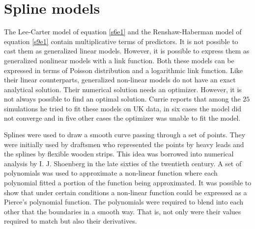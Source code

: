 \documentclass{article}
\numberwithin{equation}{section}
\begin{document}
\section{Spline models}\label{s13}
The Lee-Carter model of equation \eqref{s6e1} and the Renshaw-Haberman model
of equation \eqref{s9e1} contain multiplicative terms of predictors. It is 
not possible to cast them as generalized linear models. However, it is possible
to express them as generalized nonlinear models with a link function. Both
these models can be expressed in terms of Poisson distribution and a logarithmic
link function. Like their linear counterparts, generalized non-linear models
do not have an exact analytical solution. Their numerical solution needs an
optimizer. However, it is not always possible to find an optimal solution.
Currie reports that \cite{currie2013fitting} among the $25$ simulations he
tried to fit these models on UK data, in six cases the model did not converge
and in five other cases the optimizer was unable to fit the model. 

Splines were used to draw a smooth curve passing through a set of points. They
were initially used by draftsmen who represented the points by heavy leads and
the splines by flexible wooden strips. This idea was borrowed into numerical
analysis by I. J. Shoenberg \cite{schoenberg1969cardinal} in the late sixties
of the twentieth century. A set of polynomials was used to approximate a
non-linear function where each polynomial fitted a portion of the function
being approximated. It was possible to show that under certain conditions
\cite{schoenberg1969cardinal} a non-linear function could be expressed as a 
Pierce's polynomial function. The polynomials were required to blend into each
other that the boundaries in a smooth way. That is, not only were their values
required to match but also their derivatives.
\end{document}

